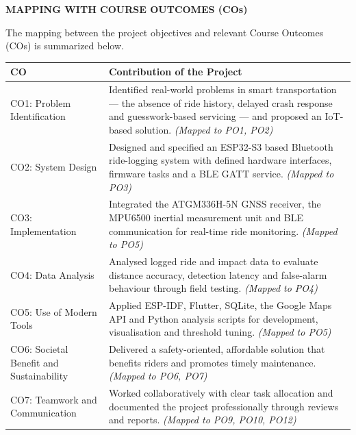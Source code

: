 \documentclass[12pt,a4paper,oneside]{report}
\begin{document}
\thispagestyle{empty}
\begin{center}{\large\bfseries MAPPING WITH COURSE OUTCOMES (COs)\par}\end{center}
\vspace{2.2em}

The mapping between the project objectives and relevant Course Outcomes (COs) is
summarized below.

\vspace{1.4em}
\begin{center}
\begin{singlespace}
\small
\renewcommand{\arraystretch}{1.3}
\begin{tabular}{|L{1.3in}|J{3.5in}|}
\hline
\textbf{CO} & \textbf{Contribution of the Project}\\
\hline
CO1: Problem Identification & Identified real-world problems in smart transportation --- the
absence of ride history, delayed crash response and guesswork-based servicing --- and
proposed an IoT-based solution. \emph{(Mapped to PO1, PO2)}\\
\hline
CO2: System Design & Designed and specified an ESP32-S3 based Bluetooth ride-logging system
with defined hardware interfaces, firmware tasks and a BLE GATT service.
\emph{(Mapped to PO3)}\\
\hline
CO3: Implementation & Integrated the ATGM336H-5N GNSS receiver, the MPU6500 inertial
measurement unit and BLE communication for real-time ride monitoring.
\emph{(Mapped to PO5)}\\
\hline
CO4: Data Analysis & Analysed logged ride and impact data to evaluate distance accuracy,
detection latency and false-alarm behaviour through field testing.
\emph{(Mapped to PO4)}\\
\hline
CO5: Use of Modern Tools & Applied ESP-IDF, Flutter, SQLite, the Google Maps API and Python
analysis scripts for development, visualisation and threshold tuning.
\emph{(Mapped to PO5)}\\
\hline
CO6: Societal Benefit and Sustainability & Delivered a safety-oriented, affordable solution
that benefits riders and promotes timely maintenance.
\emph{(Mapped to PO6, PO7)}\\
\hline
CO7: Teamwork and Communication & Worked collaboratively with clear task allocation and
documented the project professionally through reviews and reports.
\emph{(Mapped to PO9, PO10, PO12)}\\
\hline
\end{tabular}
\end{singlespace}
\end{center}
\clearpage
\end{document}
